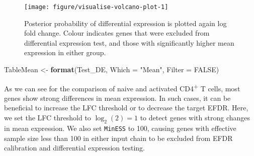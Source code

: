\documentclass[9pt,a4paper,]{extarticle}
\newenvironment{Shaded}{\begin{snugshade}}{\end{snugshade}}
\newcommand{\CommentTok}[1]{\textcolor[rgb]{0.56,0.35,0.01}{\textit{#1}}}
\newcommand{\DataTypeTok}[1]{\textcolor[rgb]{0.13,0.29,0.53}{#1}}
\newcommand{\DecValTok}[1]{\textcolor[rgb]{0.00,0.00,0.81}{#1}}
\newcommand{\KeywordTok}[1]{\textcolor[rgb]{0.13,0.29,0.53}{\textbf{#1}}}
\newcommand{\NormalTok}[1]{#1}
\newcommand{\OperatorTok}[1]{\textcolor[rgb]{0.81,0.36,0.00}{\textbf{#1}}}
\newcommand{\OtherTok}[1]{\textcolor[rgb]{0.56,0.35,0.01}{#1}}
\newcommand{\StringTok}[1]{\textcolor[rgb]{0.31,0.60,0.02}{#1}}
\begin{document}
\begin{figure}

{\centering \texttt{[image: figure/visualise-volcano-plot-1]} 

}

\caption{Posterior probability of differential expression is plotted again log fold change. Colour indicates genes that were excluded from differential expression test, and those with significantly higher mean expression in either group.}\label{fig:visualise-volcano-plot}
\end{figure}

\begin{Shaded}
\begin{Highlighting}[]
\NormalTok{TableMean <-}\StringTok{ }\KeywordTok{format}\NormalTok{(Test_DE, }\DataTypeTok{Which =} \StringTok{"Mean"}\NormalTok{, }\DataTypeTok{Filter =} \OtherTok{FALSE}\NormalTok{)}
\end{Highlighting}
\end{Shaded}

As we can see for the comparison of naive and activated CD4\textsuperscript{+} T cells, most
genes show strong differences in mean expression.
In such cases, it can be beneficial to increase the LFC threshold or to
decrease the target EFDR.
Here, we set the LFC threshold to \(\log_2(2)=1\) to detect genes
with strong changes in mean expression. We also set \texttt{MinESS} to 100,
causing genes with effective sample size less than 100 in either input chain
to be excluded from EFDR calibration and differential expression testing.

\begin{Shaded}
\end{Shaded}
\end{document}
